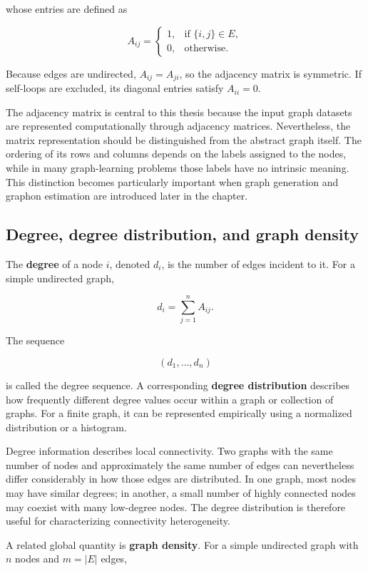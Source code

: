whose entries are defined as

\[
A_{ij}=
\begin{cases}
1, & \text{if } \{i,j\}\in E,\\
0, & \text{otherwise}.
\end{cases}
\]

Because edges are undirected, \(A_{ij}=A_{ji}\), so the adjacency matrix is symmetric. If self-loops are excluded, its diagonal entries satisfy \(A_{ii}=0\).

The adjacency matrix is central to this thesis because the input graph datasets are represented computationally through adjacency matrices. Nevertheless, the matrix representation should be distinguished from the abstract graph itself. The ordering of its rows and columns depends on the labels assigned to the nodes, while in many graph-learning problems those labels have no intrinsic meaning. This distinction becomes particularly important when graph generation and graphon estimation are introduced later in the chapter.


\subsection{Degree, degree distribution, and graph density}
\label{subsec:degree_density}

The \textbf{degree} of a node \(i\), denoted \(d_i\), is the number of edges incident to it. For a simple undirected graph,

\[
d_i=\sum_{j=1}^{n}A_{ij}.
\]

The sequence

\[
(d_1,\ldots,d_n)
\]

is called the degree sequence. A corresponding \textbf{degree distribution} describes how frequently different degree values occur within a graph or collection of graphs. For a finite graph, it can be represented empirically using a normalized distribution or a histogram.

Degree information describes local connectivity. Two graphs with the same number of nodes and approximately the same number of edges can nevertheless differ considerably in how those edges are distributed. In one graph, most nodes may have similar degrees; in another, a small number of highly connected nodes may coexist with many low-degree nodes. The degree distribution is therefore useful for characterizing connectivity heterogeneity.

A related global quantity is \textbf{graph density}. For a simple undirected graph with \(n\) nodes and \(m=|E|\) edges,

